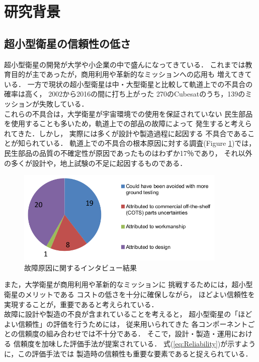 \documentclass[11pt]{article}
\begin{document}
\section{研究背景} 
\subsection{超小型衛星の信頼性の低さ}

超小型衛星の開発が大学や小企業の中で盛んになってきている．
これまでは教育目的が主であったが，商用利用や革新的なミッションへの応用も
増えてきている\cite{Langer2016}．
一方で現状の超小型衛星は中・大型衛星と比較して軌道上での不具合の確率は高く，
2002から2016の間に打ち上がった
270のCubesatのうち，139のミッションが失敗している\cite{Langer2016}．\\
これらの不具合は，大学衛星が宇宙環境での使用を保証されていない
民生部品を使用することも多いため，軌道上での部品の故障によって
発生すると考えられてきた．しかし，
実際には多くが設計や製造過程に起因する
不具合であることが知られている\cite{Venturini2017}．
軌道上での不具合の根本原因に対する調査(Figure \ref{fig:cause of failure})では，
民生部品の品質の不確定性が原因であったものはわずか17％であり，
それ以外の多くが設計や，地上試験の不足に起因するものである\cite{Venturini2017}．

\begin{figure}[H]
   \centering
      \includegraphics[height=4.5cm]{figure/cause_of_failure.png}
      \caption{故障原因に関するインタビュー結果\cite{Venturini2017}}
      \label{fig:cause of failure}
\end{figure}

また，大学衛星が商用利用や革新的なミッションに
挑戦するためには，超小型衛星のメリットである
コストの低さを十分に確保しながら，
ほどよい信頼性を実現することが，重要であると考えられている\cite{SHIRASAKA2011}．\\
故障に設計や製造の不良が含まれていることを考えると，
超小型衛星の「ほどよい信頼性」の評価を行うためには，
従来用いられてきた
各コンポーネントごとの信頼度の組み合わせでは不十分である．
そこで，設計・製造・運用における
信頼度を加味した評価手法が提案されている\cite{SHIRASAKA2011}．
式(\ref{eq:Reliability})が示すように，この評価手法では
製造時の信頼性も重要な要素であると捉えられている．
\end{document}
